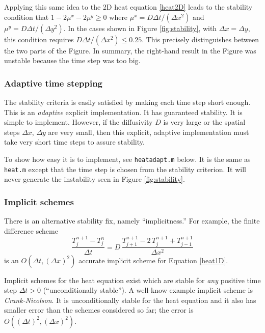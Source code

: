 \documentclass[titlepage,letterpaper,final,12pt]{scrartcl}
\newcommand{\minput}[1]{
\bigskip
\begin{quote}
\bigskip
\VerbatimInput[frame=single,framesep=3mm,label=\fbox{\normalsize \textsl{\,#1.m\,}},fontfamily=courier,fontsize=\scriptsize]{../mfiles/#1.slim.m}
\bigskip
\end{quote}
}
\begin{document}
Applying this same idea to the 2D heat equation \eqref{heat2D} leads to the stability condition that $1-2\mu^x-2\mu^y \ge 0$ where $\mu^x = D \Delta t / (\Delta x^2)$ and $\mu^y = D \Delta t / (\Delta y^2)$.  In the cases shown in Figure  \ref{fig:stability}, with $\Delta x=\Delta y$, this condition requires $D \Delta t /(\Delta x^2) \le 0.25$.  This precisely distinguishes between the two parts of the Figure.  In summary, the right-hand result in the Figure was unstable because the time step was too big.

\subsubsection*{Adaptive time stepping}  The stability criteria is easily satisfied by making each time step short enough.  This is an \textsl{adaptive} explicit implementation.  It has guaranteed stability.  It is simple to implement.  However, if the diffusivity $D$ is very large or the spatial steps $\Delta x$, $\Delta y$ are very small, then this explicit, adaptive implementation must take very short time steps to assure stability.

To show how easy it is to implement, see \texttt{heatadapt.m} below.  It is the same as \texttt{heat.m} except that the time step is chosen from the stability criterion.  It will never generate the instability seen in Figure \ref{fig:stability}.

\minput{heatadapt}

\subsubsection*{Implicit schemes}  There is an alternative stability fix, namely ``implicitness.''  For example, the finite difference scheme
\begin{equation}
  \frac{T_j^{n+1} - T_j^n}{\Delta t} = D\,\frac{T_{j+1}^{n+1} - 2\, T_j^{n+1} + T_{j-1}^{n+1}}{\Delta x^2} \label{implicit1D}
\end{equation}
is an $O(\Delta t,(\Delta x)^2)$ accurate implicit scheme for Equation \eqref{heat1D}.

Implicit schemes for the heat equation exist which are stable for \emph{any} positive time step $\Delta t>0$ (``unconditionally stable'').  A well-know example implicit scheme is \emph{Crank-Nicolson}.  It is unconditionally stable for the heat equation and it also has smaller error than the schemes considered so far; the error is $O((\Delta t)^2,(\Delta x)^2)$.
\end{document}
